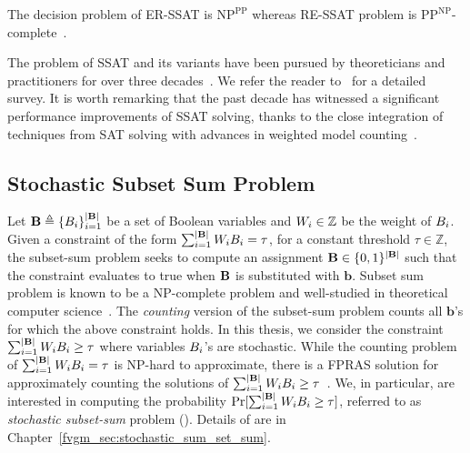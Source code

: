 \begin{remark}
	The decision problem of ER-SSAT is $\mathrm{NP}^{\mathrm{PP}}$ whereas RE-SSAT problem is $\mathrm{PP}^{\mathrm{NP}}$-complete~\cite{littman2001stochastic}.
\end{remark}



The problem of SSAT and its variants have been pursued by theoreticians and practitioners for over three decades~\cite{majercik2005dc,fremont2017maximum,huang2006combining}. We refer the reader to~\cite{lee2017solving,lee2018solving} for a detailed survey. It is worth remarking that the past decade has witnessed a significant performance improvements of SSAT solving, thanks to the close integration of techniques from SAT solving with advances in weighted model counting~\cite{sang2004combining,chakraborty2013scalable,chakraborty2014distribution}. 


\subsection{Stochastic Subset Sum Problem} 
Let $ \mathbf{B} \triangleq \{B_i\}_{i=1}^{|\mathbf{B}|}$ be a set of Boolean variables and $ W_i \in \mathbb{Z} $ be the weight of $ B_i $. Given a constraint of the form  $\sum_{i = 1}^ {|\mathbf{B}|} W_i B_i = \tau $, for a constant threshold $ \tau \in \mathbb{Z} $, the subset-sum problem seeks to compute an assignment $\mathbf{B} \in \{0,1\}^{|\mathbf{B}|}$ such that the constraint evaluates to true when $\mathbf{B}$ is substituted with $ \mathbf{b} $. Subset sum problem is known to be a $ \mathrm{NP} $-complete problem and well-studied in theoretical computer science~\cite{kleinberg2006algorithm}. The \textit{counting} version of the subset-sum problem counts all $  \mathbf{b}  $'s for which the above constraint holds. In this thesis, we consider the constraint $\sum_{i = 1}^ {|\mathbf{B}|} W_i B_i \ge \tau $ where variables $ B_i $'s are stochastic. While the counting problem of $ \sum_{i = 1}^ {|\mathbf{B}|} W_i B_i =  \tau $ is NP-hard to approximate, there is a FPRAS solution for approximately counting the solutions of $ \sum_{i = 1}^ {|\mathbf{B}|} W_i B_i \ge  \tau $~\cite{dyer2003approximate}. We, in particular, are interested in computing the probability  $ \Pr[\sum_{i = 1}^ {|\mathbf{B}|} W_iB_i \ge \tau] $, referred to as \textit{stochastic subset-sum}  problem ({\stochastic}).    Details of {\stochastic} are in Chapter~\ref{fvgm_sec:stochastic_sum_set_sum}.



